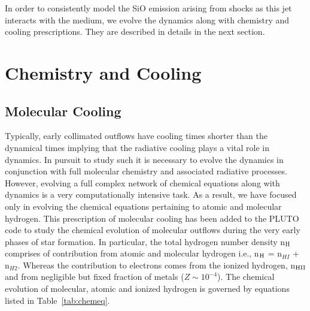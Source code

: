 \documentclass[useAMS,usenatbib,letters]{mn2e}
\begin{document}
%

In order to consistently model the SiO emission arising from shocks as
this jet interacts with the medium, we evolve the dynamics along with
chemistry and cooling prescriptions. They are described in details in
the next section.






 

\section{Chemistry and Cooling}
\label{sec:chem}
\subsection{Molecular Cooling}
\label{ssec:molcool}
Typically, early collimated outflows have cooling times shorter than
the dynamical times implying that the radiative cooling plays a vital
role in dynamics. In pursuit to study such it is necessary to evolve
the dynamics in conjunction with full molecular chemistry and
associated radiative processes. However, evolving a full complex
network of chemical equations along with dynamics is a very
computationally intensive task. As a result, we have focused only in
evolving the chemical equations pertaining to atomic and molecular
hydrogen. This prescription of molecular cooling has been added to the PLUTO
code to study the chemical evolution of molecular outflows during the
very early phases of star formation. In particular, the total hydrogen
number density n$_{\rm H}$ comprises of contribution from atomic and
molecular hydrogen i.e., n$_{\rm H}$ = n$_{HI}$ + n$_{H2}$. Whereas
the contribution to electrons comes from the ionized hydrogen, n$_{\rm HII}$ and
from negligible but fixed fraction of metals ($Z \sim 10^{-4}$).
The chemical evolution of molecular, atomic and ionized hydrogen is governed by
equations listed in Table~\ref{tab:chemeq}. 
%
\end{document}
